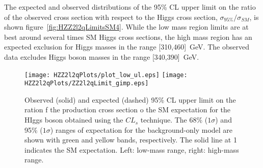 The expected and observed  distributions of the 
95\% CL upper limit on the ratio of the observed cross section
with respect to the Higgs cross section,
$\sigma_{95\%}/\sigma_{SM}$, is shown 
figure~\ref{fig:HZZ2l2qLimitsSM4}.  While the low mass region
limits are at best around several times SM Higgs cross sections, 
the high mass region has an expected exclusion for Higgs masses 
in the range [310,460]~GeV. The observed data excludes Higgs boson 
masses in the range [340,390]~GeV.

\begin{figure}
\begin{center}
\texttt{[image: HZZ2l2qPlots/plot\_low\_ul.eps]}
\texttt{[image: HZZ2l2qPlots/ZZ2l2qLimit\_gimp.eps]}
\caption{Observed (solid) and expected (dashed) 95\% CL upper limit on
the ration f the production cross section o the SM expectation for the 
HIggs boson obtained using the $CL_s$ technique.  The 68\% ($1\sigma$) 
and 95\% ($1\sigma$) ranges of expectation for the background-only model
are shown with green and yellow bands, respectively.  The solid line at 
1 indicates the SM expectation.  Left: low-mass range, right: high-mass
range. }
\label{fig:HZZ2l2qLimits}
\end{center}
\end{figure}


